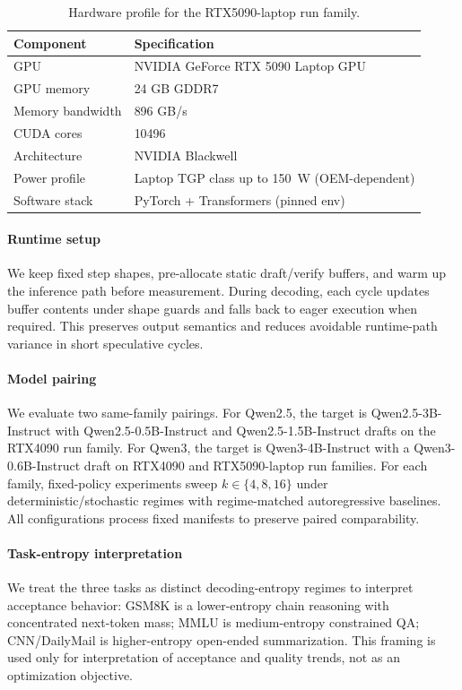 \begin{table}[t]
\centering
\caption{Hardware profile for the RTX5090-laptop run family.}
\label{tab:hw-profile-5090-laptop}
\small
\begin{tabular}{ll}
\hline
\textbf{Component} & \textbf{Specification} \\
\hline
GPU & NVIDIA GeForce RTX 5090 Laptop GPU \\
GPU memory & 24 GB GDDR7 \\
Memory bandwidth & 896 GB/s \\
CUDA cores & 10496 \\
Architecture & NVIDIA Blackwell \\
Power profile & Laptop TGP class up to 150~W (OEM-dependent) \\
Software stack & PyTorch + Transformers (pinned env) \\
\hline
\end{tabular}
\end{table}

\paragraph{Runtime setup}
We keep fixed step shapes, pre-allocate static draft/verify buffers, and warm
up the inference path before measurement. During decoding, each cycle updates
buffer contents under shape guards and falls back to eager execution when
required. This preserves output semantics and reduces avoidable runtime-path
variance in short speculative cycles.

\paragraph{Model pairing}
We evaluate two same-family pairings.
For Qwen2.5, the target is Qwen2.5-3B-Instruct with
Qwen2.5-0.5B-Instruct and Qwen2.5-1.5B-Instruct drafts on the RTX4090 run
family. For Qwen3, the target is Qwen3-4B-Instruct with a
Qwen3-0.6B-Instruct draft on RTX4090 and RTX5090-laptop run families.
For each family, fixed-policy experiments sweep $k\in\{4,8,16\}$ under
deterministic/stochastic regimes with regime-matched autoregressive baselines.
All configurations process fixed manifests to preserve paired comparability.

\paragraph{Task-entropy interpretation}
We treat the three tasks as distinct decoding-entropy regimes to interpret
acceptance behavior: GSM8K is a lower-entropy chain reasoning with concentrated
next-token mass; MMLU is medium-entropy constrained QA; CNN/DailyMail is
higher-entropy open-ended summarization. This framing is used only for
interpretation of acceptance and quality trends, not as an optimization
objective.

